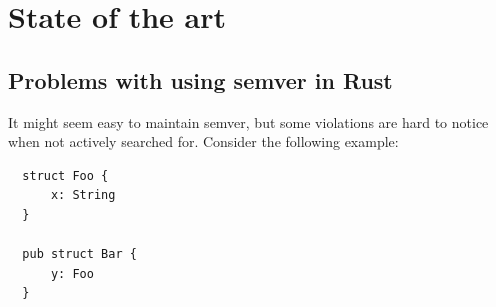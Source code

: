 \documentclass[licencjacka,en]{pracamgr}
\begin{document}




\chapter{State of the art}\label{r:chapter_stateoftheart}

\section{Problems with using semver in Rust}\label{r:section_usageofsemver}

It might seem easy to maintain semver, but some violations are hard to notice
when not actively searched for. Consider the following example:
\vspace{-3pt}
\begin{verbatim}
  struct Foo {
      x: String
  }

  pub struct Bar {
      y: Foo
  }
\end{verbatim}
\vspace{-5pt}
\end{document}
